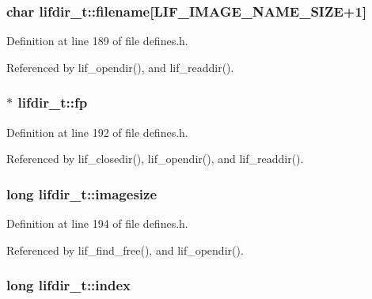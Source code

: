 \subsubsection[{\texorpdfstring{filename}{filename}}]{\setlength{\rightskip}{0pt plus 5cm}char lifdir\+\_\+t\+::filename\mbox{[}{\bf L\+I\+F\+\_\+\+I\+M\+A\+G\+E\+\_\+\+N\+A\+M\+E\+\_\+\+S\+I\+ZE}+1\mbox{]}}\hypertarget{structlifdir__t_a21bfa7a6d54009982cc63962951ba615}{}\label{structlifdir__t_a21bfa7a6d54009982cc63962951ba615}


Definition at line 189 of file defines.\+h.



Referenced by lif\+\_\+opendir(), and lif\+\_\+readdir().

\subsubsection[{\texorpdfstring{fp}{fp}}]{$\ast$ lifdir\+\_\+t\+::fp}\hypertarget{structlifdir__t_ad764305f0b8c8b95ea0f0690530babcb}{}\label{structlifdir__t_ad764305f0b8c8b95ea0f0690530babcb}


Definition at line 192 of file defines.\+h.



Referenced by lif\+\_\+closedir(), lif\+\_\+opendir(), and lif\+\_\+readdir().

\subsubsection[{\texorpdfstring{imagesize}{imagesize}}]{\setlength{\rightskip}{0pt plus 5cm}long lifdir\+\_\+t\+::imagesize}\hypertarget{structlifdir__t_a2cae1515444f013eaf439333e3952b1d}{}\label{structlifdir__t_a2cae1515444f013eaf439333e3952b1d}


Definition at line 194 of file defines.\+h.



Referenced by lif\+\_\+find\+\_\+free(), and lif\+\_\+opendir().

\subsubsection[{\texorpdfstring{index}{index}}]{\setlength{\rightskip}{0pt plus 5cm}long lifdir\+\_\+t\+::index}\hypertarget{structlifdir__t_a7b9b45ee1a56ba386158da051605a8bd}{}\label{structlifdir__t_a7b9b45ee1a56ba386158da051605a8bd}


